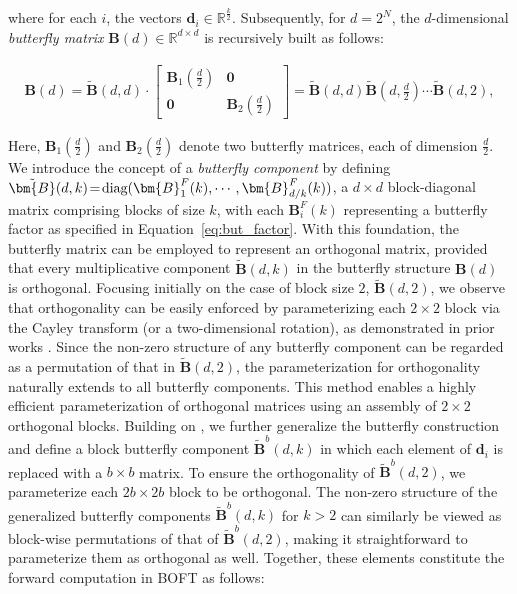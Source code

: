 where for each $i$, the vectors $\bm{d}_i\in\mathbb{R}^{\frac{k}{2}}$. Subsequently, for $d=2^N$, the $d$-dimensional \emph{butterfly matrix} $\bm{B}(d)\in\mathbb{R}^{d\times d}$ is recursively built as follows:

\begin{equation}
\begin{aligned}
    \!\!\bm{B}(d)=\tilde{\bm{B}}(d,d)\!\cdot\!\begin{bmatrix}
    \bm{B}_1(\frac{d}{2})\!\!\!\!\! & \bm{0} \\
    \bm{0}\!\!\!\!\! &\bm{B}_2(\frac{d}{2})
    \end{bmatrix}= \tilde{\bm{B}}(d,d)\tilde{\bm{B}}(d,\frac{d}{2})\cdots\tilde{\bm{B}}(d,2),
\end{aligned}
\end{equation}

Here, $\bm{B}_1(\frac{d}{2})$ and $\bm{B}_2(\frac{d}{2})$ denote two butterfly matrices, each of dimension $\frac{d}{2}$. We introduce the concept of a \emph{butterfly component} by defining $\thickmuskip=2mu \medmuskip=2mu \tilde{\bm{B}}(d,k)=\text{diag}(\bm{B}^F_1(k),\cdots,\bm{B}^F_{d/k}(k))$, a $d\times d$ block-diagonal matrix comprising blocks of size $k$, with each $\bm{B}^F_i(k)$ representing a butterfly factor as specified in Equation~\ref{eq:but_factor}. With this foundation, the butterfly matrix can be employed to represent an orthogonal matrix, provided that every multiplicative component $\tilde{\bm{B}}(d,k)$ in the butterfly structure $\bm{B}(d)$ is orthogonal. Focusing initially on the case of block size $2$, $\tilde{\bm{B}}(d,2)$, we observe that orthogonality can be easily enforced by parameterizing each $2\times2$ block via the Cayley transform (or a two-dimensional rotation), as demonstrated in prior works \cite{liu2021orthogonal,qiu2023controlling}. Since the non-zero structure of any butterfly component can be regarded as a permutation of that in $\tilde{\bm{B}}(d,2)$, the parameterization for orthogonality naturally extends to all butterfly components. This method enables a highly efficient parameterization of orthogonal matrices using an assembly of $2\times2$ orthogonal blocks. Building on \cite{chen2022pixelated}, we further generalize the butterfly construction and define a block butterfly component $\tilde{\bm{B}}^b(d,k)$ in which each element of $\bm{d}_i$ is replaced with a $b\times b$ matrix. To ensure the orthogonality of $\tilde{\bm{B}}^b(d,2)$, we parameterize each $2b\times 2b$ block to be orthogonal. The non-zero structure of the generalized butterfly components $\tilde{\bm{B}}^b(d,k)$ for $k>2$ can similarly be viewed as block-wise permutations of that of $\tilde{\bm{B}}^b(d,2)$, making it straightforward to parameterize them as orthogonal as well. Together, these elements constitute the forward computation in BOFT as follows:

